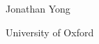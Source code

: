 \hspace{0pt}
\vfill
\begin{center}
    \Huge
    \thesistitle

    \vspace{0.6cm}

    \Large Jonathan Yong

    \vspace{0.6cm}

    \Large University of Oxford
\end{center}
\thispagestyle{empty}
\vfill
\hspace{0pt}
\newpage
